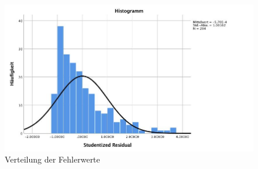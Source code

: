 \begin{figure}[h]
  \centering
     \includegraphics[scale=0.4]{content/Grafik/Histogramm_Hypo2_Residuen.jpg}
  \captionsetup{margin=80pt}
  \caption{Verteilung der Fehlerwerte}
  \label{fig:AppHistogrammResiduen}
\end{figure}